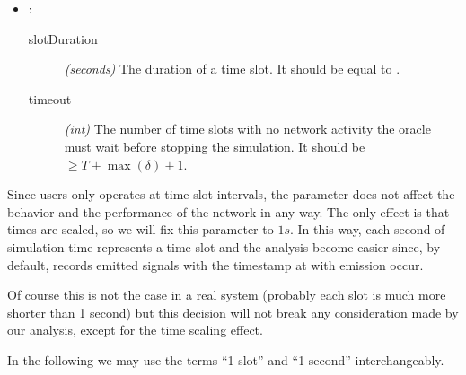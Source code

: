 \begin{itemize}
	\item {}:
		\begin{description}
			\item[slotDuration] \textit{(seconds)} The duration of a
				time slot. It should be equal to
				.
			\item[timeout] \textit{(int)} The number of time slots
				with no network activity the oracle must wait
				before stopping the simulation. It should be
				\(\geq T + \max(\delta) + 1\).
		\end{description}
\end{itemize}

\begin{tcolorbox}[title=Note]
	Since users only operates at time slot intervals, the parameter
	 does not affect the behavior and the performance of
	the network in any way. The only effect is that times  are scaled, so we will fix this parameter to \(1s\). In
	this way, each second of simulation time represents a time slot and the
	analysis become easier since, by default, \omnetpp{} records emitted
	signals with the timestamp at with emission occur.

	Of course this is not the case in a real system (probably each slot is
	much more shorter than 1 second) but this decision will not break any
	consideration made by our analysis, except for the time scaling effect.

	In the following we may use the terms ``1 slot'' and ``1 second''
	interchangeably.
\end{tcolorbox}
